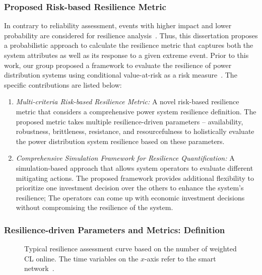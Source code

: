 \subsubsection{Proposed Risk-based Resilience Metric}
In contrary to reliability assessment, events with higher impact and lower probability are considered for resilience analysis~\cite{panteli2015grid}. Thus, this dissertation proposes a probabilistic approach to calculate the resilience metric that captures both the system attributes as well as its response to a given extreme event. Prior to this work, our group proposed a framework to evaluate the resilience of power distribution systems using conditional value-at-risk as a risk measure~\cite{poudel2019risk}. The specific contributions are listed below:

\begin{enumerate}
    \item \textit{Multi-criteria Risk-based Resilience Metric:} A novel risk-based resilience metric that considers a comprehensive power system resilience definition. The proposed metric takes multiple resilience-driven parameters -- availability, robustness, brittleness, resistance, and resourcefulness to holistically evaluate the power distribution system resilience based on these parameters. 
    \item \textit{Comprehensive Simulation Framework for Resilience Quantification:} A simulation-based approach that allows system operators to evaluate different mitigating actions. The proposed framework provides additional flexibility to prioritize one investment decision over the others to enhance the system's resilience; The operators can come up with economic investment decisions without compromising the resilience of the system.   
\end{enumerate}

\subsubsection{Resilience-driven Parameters and Metrics: Definition}

\begin{figure}[!ht!]
    \centering
    \caption{Typical resilience assessment curve based on the number of weighted CL online. The time variables on the $x$-axis refer to the smart network~\cite{2016}.}
    \label{fig:resilience_curve}
\end{figure}

